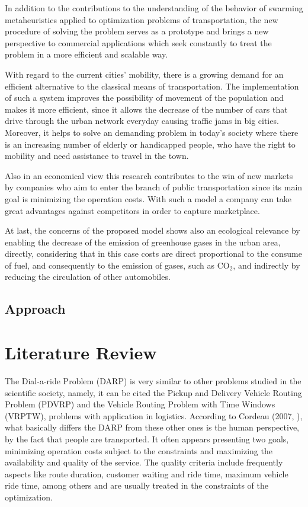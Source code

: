 \documentclass[tuberlin,cic,tc,openright,english,noabntcite]{iiufrgs}
\begin{document}
In addition to the contributions to the understanding of the behavior of swarming metaheuristics applied to optimization problems of transportation, the new procedure of solving the problem serves as a prototype and brings a new perspective to commercial applications which seek constantly to treat the problem in a more efficient and scalable way.

With regard to the current cities' mobility, there is a growing demand for an efficient alternative to the classical means of transportation. The implementation of such a system improves the possibility of movement of the population and makes it more efficient, since it allows the decrease of the number of cars that drive through the urban network everyday causing traffic jams in big cities. Moreover, it helps to solve an demanding problem in today's society where there is an increasing number of elderly or handicapped people, who have the right to mobility and need assistance to travel in the town.

Also in an economical view this research contributes to the win of new markets by companies who aim to enter the branch of public transportation since its main goal is minimizing the operation costs. With such a model a company can take great advantages against competitors in order to capture marketplace.

At last, the concerns of the proposed model shows also an ecological relevance by enabling the decrease of the emission of greenhouse gases in the urban area, directly, considering that in this case costs are direct proportional to the consume of fuel, and consequently to the emission of gases, such as CO$_{2}$, and indirectly by reducing the circulation of other automobiles.

\section{Approach}

\chapter{Literature Review}
The Dial-a-ride Problem (DARP) is very similar to other problems studied in the scientific society, namely, it can be cited the Pickup and Delivery Vehicle Routing Problem (PDVRP) and the Vehicle Routing Problem with Time Windows (VRPTW), problems with application in logistics. According to Cordeau (2007, \cite{Cordeau2007}), what basically differs the DARP from these other ones is the human perspective, by the fact that people are transported. It often appears presenting two goals, minimizing operation costs subject to the constraints and maximizing the availability and quality of the service. The quality criteria include frequently aspects like route duration, customer waiting and ride time, maximum vehicle ride time, among others and are usually treated in the constraints of the optimization.
\end{document}
